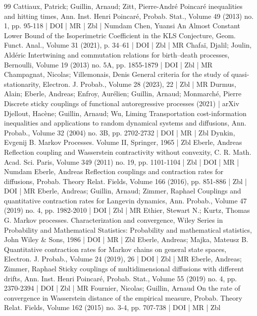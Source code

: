 \begin{thebibliography}{99}
 Cattiaux, Patrick; Guillin, Arnaud; Zitt, Pierre-André Poincaré inequalities and hitting times, Ann. Inst. Henri Poincaré, Probab. Stat., Volume 49 (2013) no. 1, pp. 95-118 | DOI | MR | Zbl | Numdam
 Chen, Yuansi An Almost Constant Lower Bound of the Isoperimetric Coefficient in the KLS Conjecture, Geom. Funct. Anal., Volume 31 (2021), p. 34–61 | DOI | Zbl | MR
 Chafaï, Djalil; Joulin, Aldéric Intertwining and commutation relations for birth–death processes, Bernoulli, Volume 19 (2013) no. 5A, pp. 1855-1879 | DOI | Zbl | MR
 Champagnat, Nicolas; Villemonais, Denis General criteria for the study of quasi-stationarity, Electron. J. Probab., Volume 28 (2023), 22 | Zbl | MR
 Durmus, Alain; Eberle, Andreas; Enfroy, Aurélien; Guillin, Arnaud; Monmarché, Pierre Discrete sticky couplings of functional autoregressive processes (2021) | arXiv
 Djellout, Hacène; Guillin, Arnaud; Wu, Liming Transportation cost-information inequalities and applications to random dynamical systems and diffusions, Ann. Probab., Volume 32 (2004) no. 3B, pp. 2702-2732 | DOI | MR | Zbl
 Dynkin, Evgenij B. Markov Processes. Volume II, Springer, 1965 | Zbl
 Eberle, Andreas Reflection coupling and Wasserstein contractivity without convexity, C. R. Math. Acad. Sci. Paris, Volume 349 (2011) no. 19, pp. 1101-1104 | Zbl | DOI | MR | Numdam
 Eberle, Andreas Reflection couplings and contraction rates for diffusions, Probab. Theory Relat. Fields, Volume 166 (2016), pp. 851-886 | Zbl | DOI | MR
 Eberle, Andreas; Guillin, Arnaud; Zimmer, Raphael Couplings and quantitative contraction rates for Langevin dynamics, Ann. Probab., Volume 47 (2019) no. 4, pp. 1982-2010 | DOI | Zbl | MR
 Ethier, Stewart N.; Kurtz, Thomas G. Markov processes. Characterization and convergence, Wiley Series in Probability and Mathematical Statistics: Probability and mathematical statistics, John Wiley \& Sons, 1986 | DOI | MR | Zbl
 Eberle, Andreas; Majka, Mateusz B. Quantitative contraction rates for Markov chains on general state spaces, Electron. J. Probab., Volume 24 (2019), 26 | DOI | Zbl | MR
 Eberle, Andreas; Zimmer, Raphael Sticky couplings of multidimensional diffusions with different drifts, Ann. Inst. Henri Poincaré, Probab. Stat., Volume 55 (2019) no. 4, pp. 2370-2394 | DOI | Zbl | MR
 Fournier, Nicolas; Guillin, Arnaud On the rate of convergence in Wasserstein distance of the empirical measure, Probab. Theory Relat. Fields, Volume 162 (2015) no. 3-4, pp. 707-738 | DOI | MR | Zbl

\end{thebibliography}

